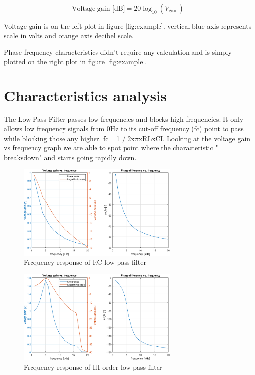 \documentclass[notitlepage, a4paper, 11pt]{article}
\begin{document}
	\begin{equation}
		\text{Voltage gain [dB]} = 20 \log_{10}(V_{\text{gain}})
	\end{equation}
	
	Voltage gain is on the left plot in figure \ref{fig:example}, vertical blue axis represents scale in volts and orange axis decibel scale.
	
	Phase-frequency characteristics didn't require any calculation and is simply plotted on the right plot in figure \ref{fig:example}.
	
	\section{Characteristics analysis}
	
	The Low Pass Filter passes low frequencies and blocks high frequencies.
	It only allows low frequency signals from 0Hz to its cut-off frequency (fc) point to pass while blocking those any higher.  fc= 1 / 2x$\pi$xRLxCL 
	Looking at the voltage gain vs frequency graph we are able to spot point where the characteristic " breaksdown" and starts going rapidly down.
	
	\begin{figure}[H]
		\centering
		\includegraphics[width=0.7\textwidth]{../Matlab/img/11.eps}
		\caption{Frequency response of RC low-pass filter}
	\end{figure}
	\begin{figure}[H]
		\centering
		\includegraphics[width=0.7\textwidth]{../Matlab/img/12.eps}
		\caption{Frequency response of III-order low-pass filter}
	\end{figure}
	
\end{document}
